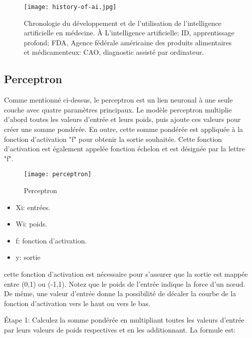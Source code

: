     \begin{figure}[H]
        \centering
        \texttt{[image: history-of-ai.jpg]}
        \caption{Chronologie du développement et de l'utilisation de l'intelligence artificielle en médecine. 
        À L'intelligence artificielle; ID, apprentissage profond; FDA, Agence fédérale américaine des produits alimentaires et médicamenteux: CAO, diagnostic assisté par ordinateur.
        }
        \label{fig:history-of-ai}
    \end{figure}



        \subsection{Perceptron}
            Comme mentionné ci-dessus, le perceptron est  un lien neuronal à une seule couche avec quatre paramètres principaux. Le modèle perceptron multiplie d'abord toutes les valeurs d'entrée et leurs poids, puis ajoute ces valeurs pour créer une somme pondérée. En outre, cette somme pondérée est appliquée à la fonction d'activation "f" pour obtenir la sortie souhaitée. Cette fonction d'activation est également appelée fonction échelon et est désignée par la lettre "f".
            \begin{figure}[H]
                \centering
                \texttt{[image: perceptron]}
                \caption{Perceptron}
                \label{fig:perceptron}
            \end{figure}

            \begin{itemize}[label=$\bullet$]
                \item Xi: entrées.
                \item Wi: poids.
                \item f: fonction d'activation.
                \item y: sortie 
            \end{itemize}

            cette fonction d'activation est nécessaire pour s'assurer que la sortie est  mappée entre (0,1) ou (-1,1). Notez que le poids de l'entrée indique la force d'un nœud. De même, une valeur d'entrée donne la possibilité de décaler la courbe de la fonction d'activation vers le haut ou vers le bas.
            
            Étape 1: Calculez la somme pondérée en multipliant toutes les valeurs d'entrée par leurs valeurs de poids respectives et en les additionnant. La formule est:

